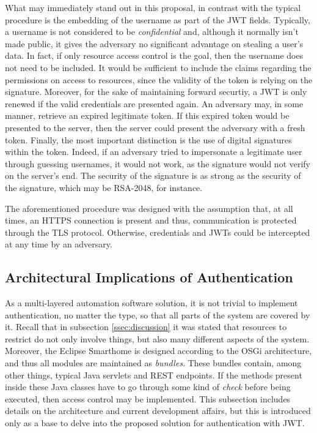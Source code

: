\documentclass[12pt]{article}
\begin{document}
What may immediately stand out in this proposal, in contrast with the typical procedure is the embedding of the username as part of the JWT fields. Typically, a username is not considered to be \emph{confidential} and, although it normally isn't made public, it gives the adversary no significant advantage on stealing a user's data. In fact, if only resource access control is the goal, then the username does not need to be included. It would be sufficient to include the claims regarding the permissions on access to resources, since the validity of the token is relying on the signature. Moreover, for the sake of maintaining forward securtiy, a JWT is only renewed if the valid credentials are presented again. An adversary may, in some manner, retrieve an expired legitimate token. If this expired token would be presented to the server, then the server could present the adversary with a fresh token. Finally, the most important distinction is the use of digital signatures within the token. Indeed, if an adversary tried to impersonate a legitimate user through guessing usernames, it would not work, as the signature would not verify on the server's end. The security of the signature is as strong as the security of the signature, which may be RSA-2048, for instance.

The aforementioned procedure was designed with the assumption that, at all times, an HTTPS connection is present and thus, communication is protected through the TLS protocol. Otherwise, credentials and JWTs could be intercepted at any time by an adversary. 

\subsection{Architectural Implications of Authentication}

As a multi-layered automation software solution, it is not trivial to implement authentication, no matter the type, so that all parts of the system are covered by it. Recall that in subsection \ref{ssec:discussion} it was stated that resources to restrict do not only involve things, but also many different aspects of the system. Moreover, the Eclipse Smarthome is designed according to the OSGi architecture, and thus all modules are maintained as \emph{bundles}. These bundles contain, among other things, typical Java servlets and REST endpoints. If the methods present inside these Java classes have to go through some kind of \emph{check} before being executed, then access control may be implemented. This subsection includes details on the architecture and current development affairs, but this is introduced only as a base to delve into the proposed solution for authentication with JWT.
\end{document}
